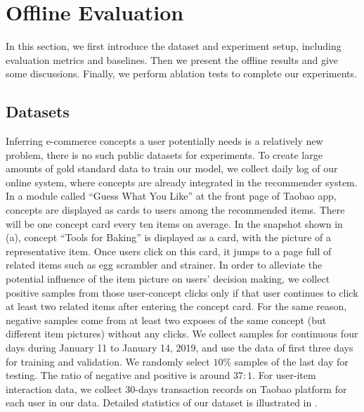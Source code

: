 \section{Offline Evaluation}
\label{sec:eval}

In this section, we first introduce the dataset and experiment setup, including evaluation metrics and baselines.
Then we present the offline results and give some discussions.
Finally, we perform ablation tests to complete our experiments.

\subsection{Datasets}

Inferring e-commerce concepts a user potentially needs is a relatively new problem, 
there is no such public datasets for experiments.
To create large amounts of gold standard data to train our model, 
we collect daily log of our online system, 
where concepts are already integrated in the recommender system. 
In a module called ``Guess What You Like'' at the front page of Taobao app, concepts are displayed as cards to users among the recommended items.
There will be one concept card every ten items on average.
In the snapshot shown in (a), concept ``Tools for Baking'' is displayed as a card, with the picture of a representative item.
Once users click on this card, 
it jumps to a page full of related items such as egg scrambler and strainer.
In order to alleviate the potential influence of the item picture on users' decision making,
we collect positive samples from those user-concept clicks
only if that user continues to click at least two related items after entering the concept card.
For the same reason, negative samples come from at least two exposes of the same concept (but different item pictures) without any clicks.
We collect samples for continuous four days during January 11 to January 14, 2019, and use the data of first three days for training and validation. 
We randomly select $10\%$ samples of the last day for testing.
The ratio of negative and positive is around $37:1$.
For user-item interaction data, we collect 30-days transaction records on Taobao platform for each user in our data.
Detailed statistics of our dataset is illustrated in .
